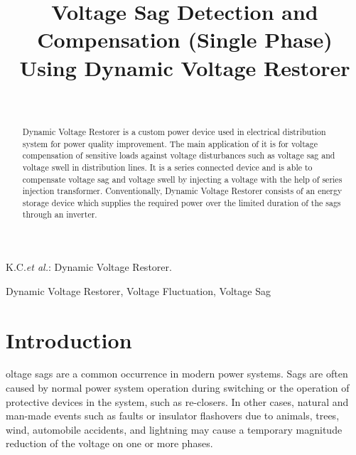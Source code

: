 \documentclass[journal,twoside]{IEEEtran}
\begin{document}
    \setcounter{page}{52}
    \title{Voltage Sag Detection and Compensation (Single Phase) Using Dynamic Voltage Restorer}
    \author{\\
    }

%
{K.C.\MakeLowercase{\textit{et al.}}: Dynamic Voltage Restorer.}
    \maketitle
	\begin{abstract}
Dynamic Voltage Restorer is a custom
power device used in electrical distribution system for
power quality improvement. The main application of it
is for voltage compensation of sensitive loads against
voltage disturbances such as voltage sag and voltage swell
in distribution lines. It is a series connected device and is
able to compensate voltage sag and voltage swell by
injecting a voltage with the help of series injection
transformer. Conventionally, Dynamic Voltage Restorer consists of an energy
storage device which supplies the required power over the
limited duration of the sags through an inverter.
	\end{abstract}
	\begin{IEEEkeywords}
Dynamic Voltage Restorer, Voltage Fluctuation, Voltage Sag 
	\end{IEEEkeywords}
	\section{Introduction}
oltage sags are a common occurrence in modern power systems. Sags are often caused by normal power system operation during switching or the operation of protective devices in the system, such as re-closers. In other cases, natural and man-made events such as faults or insulator
flashovers due to animals, trees, wind, automobile accidents, and lightning may cause a temporary magnitude reduction of the voltage on one or more phases.
\end{document}
